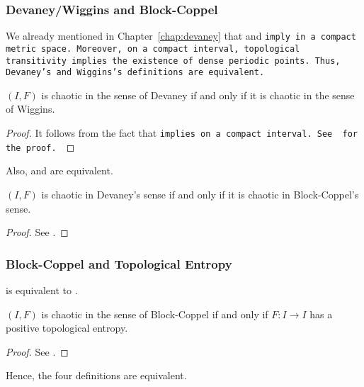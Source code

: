 \documentclass[10pt,twoside,draft]{book}
\begin{document}
\subsubsection*{Devaney/Wiggins and Block-Coppel}
We already mentioned in Chapter~\ref{chap:devaney} that \dpp and \tt imply \sdic in a compact metric space.
Moreover, on a compact interval, topological transitivity implies the existence of dense periodic points.
Thus, Devaney's and Wiggins's definitions are equivalent.
\begin{theorem}
  $(I,F)$ is chaotic in the sense of Devaney if and only if it is chaotic in the sense of Wiggins.
  \label{thm:dev-wig}
  \begin{proof}
    It follows from the fact that \tt implies \dpp on a compact interval.
    See \citet{silverman} for the proof.
  \end{proof}
\end{theorem}
Also, \dev and \blcp are equivalent.
\begin{theorem}
  $(I,F)$ is chaotic in Devaney's sense if and only if it is chaotic in Block-Coppel's sense.
  \begin{proof}
    See \citet{aulbach}.
  \end{proof}
  \label{thm:dev-blcp}
\end{theorem}

\subsubsection*{Block-Coppel and Topological Entropy}
\blcp is equivalent to \pte.
\begin{theorem}
  $(I,F)$ is chaotic in the sense of Block-Coppel if and only if $F: I \to I$ has a positive topological entropy.
  \label{thm:ent-blcp}
  \begin{proof}
    See \citet[VII, Theorem 24]{blockcoppel}.
  \end{proof}
\end{theorem}
Hence, the four definitions are equivalent.
\end{document}
